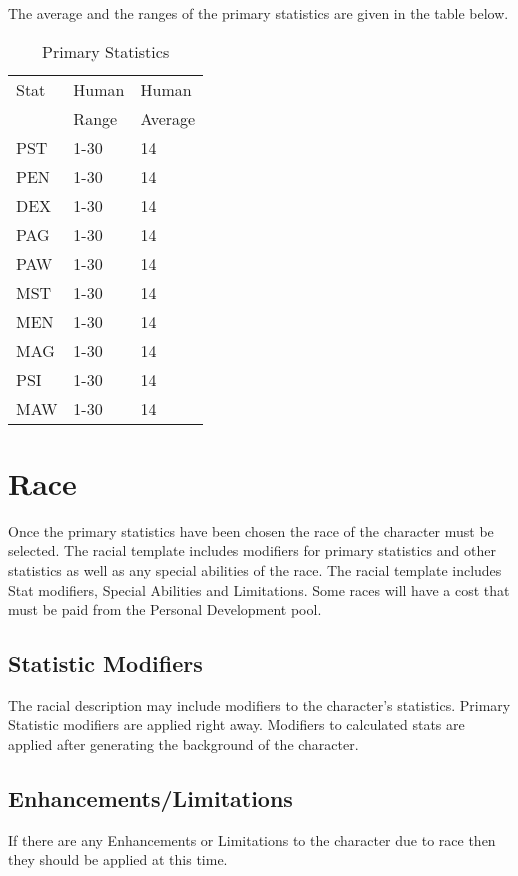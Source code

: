 The average and the ranges of the primary statistics are given in the table
below.

\begin{table}[h]
	\begin{tabular}{lll}
	Stat & Human    & Human \\
		 & Range	& Average \\
	\hline
	PST & 1-30		& 14 \\
	PEN & 1-30		& 14 \\
	DEX & 1-30		& 14 \\
	PAG & 1-30		& 14 \\
	PAW & 1-30		& 14 \\
	MST & 1-30		& 14 \\
	MEN & 1-30		& 14 \\
	MAG & 1-30		& 14 \\
	PSI & 1-30		& 14 \\
	MAW & 1-30		& 14 \\
	\end{tabular}
    \caption{Primary Statistics}
\end{table}

\section{Race}

Once the primary statistics have been chosen the race of the character
must be selected. The racial template includes modifiers for primary
statistics and other statistics as well as any special abilities of the
race. The racial template includes Stat modifiers, Special Abilities and
Limitations. Some races will have a cost that must be paid from the 
Personal Development pool.

\subsection{Statistic Modifiers}

The racial description may include modifiers to the character's statistics.
Primary Statistic modifiers are applied right away. Modifiers to calculated 
stats are applied after generating the background of the character.

\subsection{Enhancements/Limitations}

If there are any Enhancements or Limitations to the character due to race
then they should be applied at this time.

